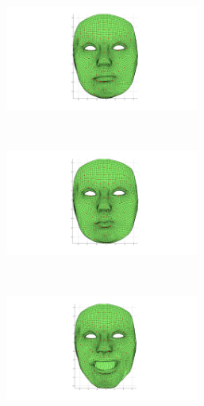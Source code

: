 \begin{figure}[htbp!]
        \centering
        \begin{subfigure}[b]{0.25\textwidth}
                \includegraphics[trim = 160mm 20mm 160mm 10mm, clip,width=0.7\textwidth]{img/weights/3D/Emily_marked/neutralE_marked.png}
        \end{subfigure}%
        ~ %
        \begin{subfigure}[b]{0.25\textwidth}
                \includegraphics[trim = 160mm 20mm 160mm 10mm, clip,width=0.7\textwidth]{img/weights/3D/Emily_marked/blendshapeE_marked_50.png}
        \end{subfigure}
        ~ %
        \begin{subfigure}[b]{0.25\textwidth}
                \includegraphics[trim = 160mm 20mm 160mm 10mm,clip,width=0.7\textwidth]{img/weights/3D/Emily_marked/blendshapeE_marked_56.png} 

\end{subfigure}
\end{figure}
